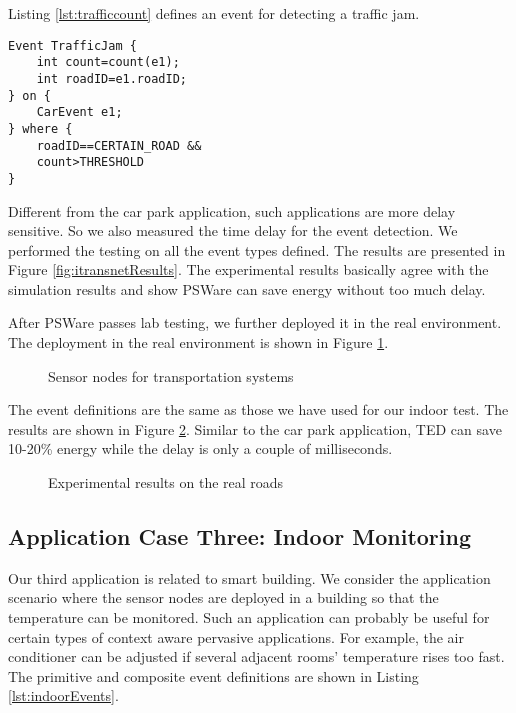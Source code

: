 Listing \ref{lst:trafficcount} defines an event for detecting a traffic jam.
\begin{lstlisting}[caption=Event definition for traffic jam, label=lst:trafficcount]
Event TrafficJam {
	int count=count(e1);
	int roadID=e1.roadID;
} on {
	CarEvent e1;
} where {
	roadID==CERTAIN_ROAD &&
	count>THRESHOLD
}
\end{lstlisting}

Different from the car park application, such applications are more delay sensitive. So we also measured the time delay for the event detection. We performed the testing on all the event types defined. The results are presented in Figure \ref{fig:itransnetResults}. The experimental results basically agree with the simulation results and show PSWare can save energy without too much delay.

After PSWare passes lab testing, we further deployed it in the real environment. The deployment in the real environment is shown in Figure \ref{fig:itsSensor}.

\begin{figure}
\centering
{}
\caption{Sensor nodes for transportation systems}
\label{fig:itsSensor}
\end{figure}

The event definitions are the same as those we have used for our indoor test. The results are shown in Figure \ref{fig:itsResults}. Similar to the car park application, TED can save 10-20\% energy while the delay is only a couple of milliseconds.
 
\begin{figure}
\centering
{}
\caption{Experimental results on the real roads}
\label{fig:itsResults}
\end{figure}

\subsection{Application Case Three: Indoor Monitoring}
Our third application is related to smart building. We consider the application scenario where the sensor nodes are deployed in a building so that the temperature can be monitored. Such an application can probably be useful for certain types of context aware pervasive applications. For example, the air conditioner can be adjusted if several adjacent rooms' temperature rises too fast. The primitive and composite event definitions are shown in Listing \ref{lst:indoorEvents}.

